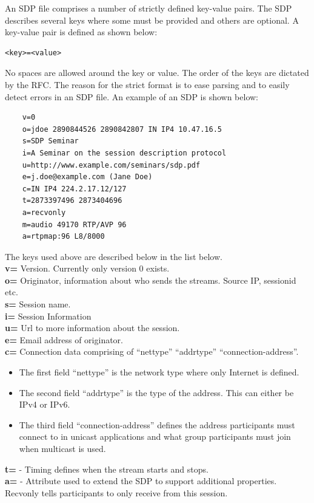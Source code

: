 An SDP file comprises a number of strictly defined key-value pairs. The SDP describes several keys where some must be provided and others are optional. A key-value pair is defined as shown below:
\begin{verbatim}
<key>=<value>
\end{verbatim}

No spaces are allowed around the key or value.
The order of the keys are dictated by the RFC. The reason for the strict format is to ease parsing and to easily detect errors in an SDP file. An example of an SDP is shown below:

\begin{verbatim}
    v=0
    o=jdoe 2890844526 2890842807 IN IP4 10.47.16.5
    s=SDP Seminar
    i=A Seminar on the session description protocol
    u=http://www.example.com/seminars/sdp.pdf
    e=j.doe@example.com (Jane Doe)
    c=IN IP4 224.2.17.12/127
    t=2873397496 2873404696
    a=recvonly
    m=audio 49170 RTP/AVP 96
    a=rtpmap:96 L8/8000
\end{verbatim}
The keys used above are described below in the list below. \\
\textbf{v=} Version. Currently only version 0 exists. \\
\textbf{o=} Originator, information about who sends the streams. Source IP, sessionid etc. \\
\textbf{s=} Session name. \\
\textbf{i=} Session Information \\
\textbf{u=} Url to more information about the session.\\
\textbf{e=} Email address of originator.\\
\textbf{c=} Connection data comprising of ``nettype'' ``addrtype'' ``connection-address''.
\begin{itemize}
	\item The first field ``nettype'' is the network type where only Internet is defined. 
	\item The second field ``addrtype'' is the type of the address. This can either be IPv4 or IPv6.
	\item The third field ``connection-address'' defines the address participants must connect to in unicast applications and what group participants must join when multicast is used.
\end{itemize}
\textbf{t=} - Timing defines when the stream starts and stops. \\
\textbf{a=} - Attribute used to extend the SDP to support additional properties. Recvonly tells participants to only receive from this session. \\
